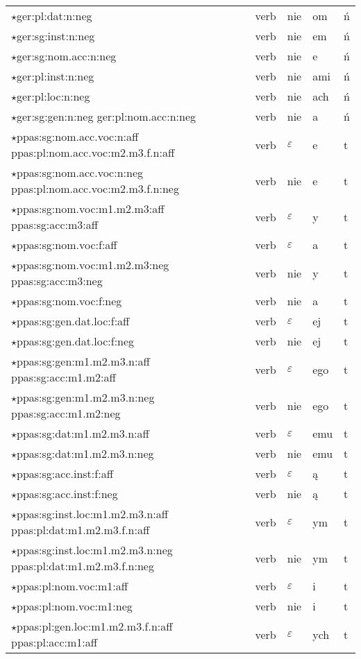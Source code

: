 \documentclass{article}
\begin{document}
\begin{longtable}{p{7cm}|l|l|l|l}
$\star$ger:pl:dat:n:neg & verb & nie & om & ń\\
$\star$ger:sg:inst:n:neg & verb & nie & em & ń\\
$\star$ger:sg:nom.acc:n:neg & verb & nie & e & ń\\
$\star$ger:pl:inst:n:neg & verb & nie & ami & ń\\
$\star$ger:pl:loc:n:neg & verb & nie & ach & ń\\
$\star$ger:sg:gen:n:neg ger:pl:nom.acc:n:neg & verb & nie & a & ń\\
$\star$ppas:sg:nom.acc.voc:n:aff ppas:pl:nom.acc.voc:m2.m3.f.n:aff & verb & $\varepsilon$ & e & t\\
$\star$ppas:sg:nom.acc.voc:n:neg ppas:pl:nom.acc.voc:m2.m3.f.n:neg & verb & nie & e & t\\
$\star$ppas:sg:nom.voc:m1.m2.m3:aff ppas:sg:acc:m3:aff & verb & $\varepsilon$ & y & t\\
$\star$ppas:sg:nom.voc:f:aff & verb & $\varepsilon$ & a & t\\
$\star$ppas:sg:nom.voc:m1.m2.m3:neg ppas:sg:acc:m3:neg & verb & nie & y & t\\
$\star$ppas:sg:nom.voc:f:neg & verb & nie & a & t\\
$\star$ppas:sg:gen.dat.loc:f:aff & verb & $\varepsilon$ & ej & t\\
$\star$ppas:sg:gen.dat.loc:f:neg & verb & nie & ej & t\\
$\star$ppas:sg:gen:m1.m2.m3.n:aff ppas:sg:acc:m1.m2:aff & verb & $\varepsilon$ & ego & t\\
$\star$ppas:sg:gen:m1.m2.m3.n:neg ppas:sg:acc:m1.m2:neg & verb & nie & ego & t\\
$\star$ppas:sg:dat:m1.m2.m3.n:aff & verb & $\varepsilon$ & emu & t\\
$\star$ppas:sg:dat:m1.m2.m3.n:neg & verb & nie & emu & t\\
$\star$ppas:sg:acc.inst:f:aff & verb & $\varepsilon$ & ą & t\\
$\star$ppas:sg:acc.inst:f:neg & verb & nie & ą & t\\
$\star$ppas:sg:inst.loc:m1.m2.m3.n:aff ppas:pl:dat:m1.m2.m3.f.n:aff & verb & $\varepsilon$ & ym & t\\
$\star$ppas:sg:inst.loc:m1.m2.m3.n:neg ppas:pl:dat:m1.m2.m3.f.n:neg & verb & nie & ym & t\\
$\star$ppas:pl:nom.voc:m1:aff & verb & $\varepsilon$ & i & t\\
$\star$ppas:pl:nom.voc:m1:neg & verb & nie & i & t\\
$\star$ppas:pl:gen.loc:m1.m2.m3.f.n:aff ppas:pl:acc:m1:aff & verb & $\varepsilon$ & ych & t\\

\end{longtable}
\end{document}
